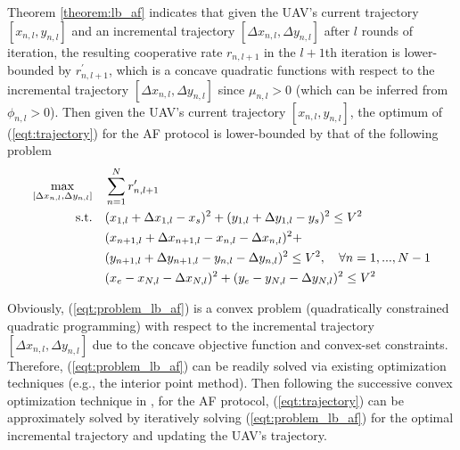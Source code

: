 \documentclass[12pt, draftclsnofoot, onecolumn]{IEEEtran}
\begin{document}
Theorem \ref{theorem:lb_af} indicates that given the UAV's current trajectory $[x_{n,l},y_{n,l}]$ and an incremental trajectory $[\Delta x_{n,l},\Delta y_{n,l}]$ after $l$ rounds of iteration, the resulting cooperative rate $r_{n,l+1}$ in the $l+1$th iteration is lower-bounded by $r^{\prime}_{n,l+1}$, which is a concave quadratic functions with respect to the incremental trajectory $[\Delta x_{n,l},\Delta y_{n,l}]$ since $\mu_{n,l}>0$ (which can be inferred from $\phi_{n,l}>0$). Then given the UAV's current trajectory $[x_{n,l},y_{n,l}]$, the optimum of (\ref{eqt:trajectory}) for the AF protocol is lower-bounded by that of the following problem
\begin{equation}\label{eqt:problem_lb_af}
\begin{aligned}
\max\limits_{[\Delta x_{n,l},\Delta y_{n,l}]}\quad &\sum\limits _{n=1}^{N}r^{\prime}_{n,l+1}\\
{\rm s.t.}\quad &(x_{1,l}+\Delta x_{1,l}-x_{s})^{2}+(y_{1,l}+\Delta y_{1,l}-y_{s})^{2}\leq V^{2}\\
&(x_{n+1,l}+\Delta x_{n+1,l}-x_{n,l}-\Delta x_{n,l})^{2}+\\
&(y_{n+1,l}+\Delta y_{n+1,l}-y_{n,l}-\Delta y_{n,l})^{2}\leq V^{2},\quad\forall n=1,...,N-1\\
&(x_{e}-x_{N,l}-\Delta x_{N,l})^{2}+(y_{e}-y_{N,l}-\Delta y_{N,l})^{2}\leq V^{2}
\end{aligned}
\end{equation}

Obviously, (\ref{eqt:problem_lb_af}) is a convex problem (quadratically constrained quadratic programming) with respect to the incremental trajectory $[\Delta x_{n,l},\Delta y_{n,l}]$ due to the concave objective function and convex-set constraints. Therefore, (\ref{eqt:problem_lb_af}) can be readily solved via existing optimization techniques (e.g., the interior point method). Then following the successive convex optimization technique in \cite{7572068}, for the AF protocol, (\ref{eqt:trajectory}) can be approximately solved by iteratively solving (\ref{eqt:problem_lb_af}) for the optimal incremental trajectory and updating the UAV's trajectory.
\end{document}
